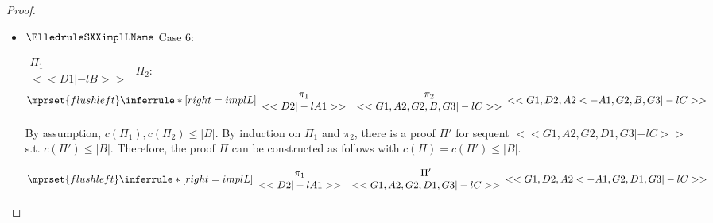 \begin{proof}
\begin{enumerate}
\begin{itemize}
  \item $\ElledruleSXXimplLName$ Case 6:
    \begin{center}
      \scriptsize
      \begin{math}
        \begin{array}{c}
          \Pi_1 \\
          {<<D1 |-l B>>}
        \end{array}
      \end{math}
      \qquad\qquad
      $\Pi_2$:
      \begin{math}
        $$\mprset{flushleft}
        \inferrule* [right={\tiny implL}] {
          {
            \begin{array}{cc}
              \pi_1 & \pi_2 \\
              {<<D2 |-l A1>>} & {<<G1, A2, G2, B, G3 |-l C>>}
            \end{array}
          }
        }{<<G1, D2, A2 <- A1, G2, B, G3 |-l C>>}
      \end{math}
    \end{center}
    By assumption, $c(\Pi_1),c(\Pi_2)\leq |B|$. By induction on $\Pi_1$ and $\pi_2$, there is a
    proof $\Pi'$ for sequent $<<G1, A2, G2, D1, G3 |-l C>>$ s.t. $c(\Pi') \leq |B|$. Therefore,
    the proof $\Pi$ can be constructed as follows with $c(\Pi) = c(\Pi') \leq |B|$.
    \begin{center}
      \scriptsize
      \begin{math}
        $$\mprset{flushleft}
        \inferrule* [right={\tiny implL}] {
          {
            \begin{array}{cc}
              \pi_1 & \Pi' \\
              {<<D2 |-l A1>>} & {<<G1, A2, G2, D1, G3 |-l C>>}
            \end{array}
          }
        }{<<G1, D2, A2 <- A1, G2, D1, G3 |-l C>>}
      \end{math}
    \end{center}


\end{itemize}
\end{enumerate}
\end{proof}
